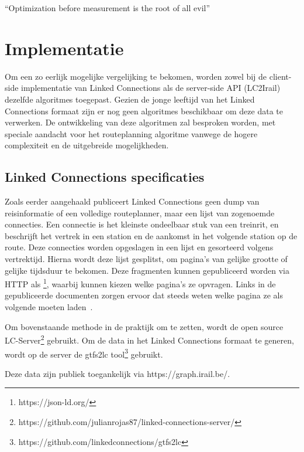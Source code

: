\begin{savequote}[0.55\linewidth]
	``Optimization before measurement is the root of all evil''
\end{savequote}

\chapter{Implementatie}
\label{chap:implementatie}

Om een zo eerlijk mogelijke vergelijking te bekomen, worden zowel bij de client-side implementatie van Linked Connections als de server-side API (LC2Irail) dezelfde algoritmes toegepast. Gezien de jonge leeftijd van het Linked Connections formaat zijn er nog geen algoritmes beschikbaar om deze data te verwerken. De ontwikkeling van deze algoritmen zal besproken worden, met speciale aandacht voor het routeplanning algoritme vanwege de hogere complexiteit en de uitgebreide mogelijkheden.

\section{Linked Connections specificaties}
\label{sec:lcformaat}
Zoals eerder aangehaald publiceert Linked Connections geen dump van reisinformatie of een volledige routeplanner, maar een lijst van zogenoemde connecties. Een connectie is het kleinste ondeelbaar stuk van een treinrit, en beschrijft het vertrek in een station en de aankomst in het volgende station op de route. Deze connecties worden opgeslagen in een lijst en gesorteerd volgens vertrektijd. Hierna wordt deze lijst gesplitst, om pagina's van gelijke grootte of gelijke tijdsduur te bekomen. Deze fragmenten kunnen gepubliceerd worden via HTTP als \footnote{https://json-ld.org/}, waarbij  kunnen kiezen welke pagina's ze opvragen. Links in de gepubliceerde documenten zorgen ervoor dat  steeds weten welke pagina ze als volgende moeten laden~\citep{linkedconnections18}.

Om bovenstaande methode in de praktijk om te zetten, wordt de open source LC-Server\footnote{https://github.com/julianrojas87/linked-connections-server/} gebruikt. Om de data in het Linked Connections formaat te generen, wordt op de server de gtfs2lc tool\footnote{https://github.com/linkedconnections/gtfs2lc} gebruikt.

Deze data zijn publiek toegankelijk via https://graph.irail.be/.


